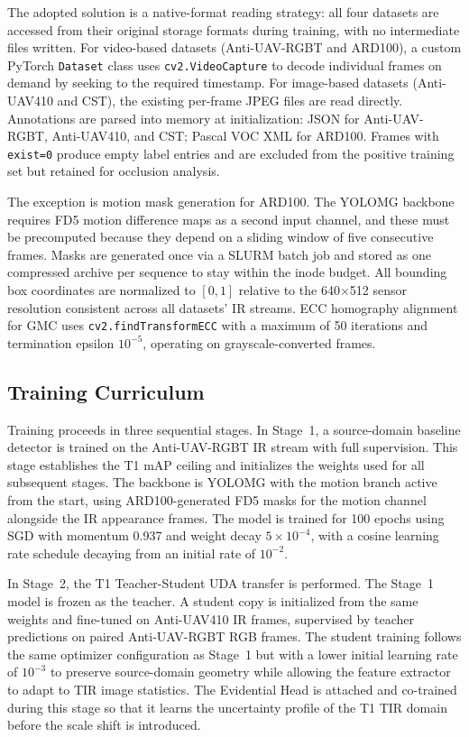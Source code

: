 The adopted solution is a native-format reading strategy: all four datasets are accessed from their original storage formats during training, with no intermediate files written. For video-based datasets (Anti-UAV-RGBT and ARD100), a custom PyTorch \texttt{Dataset} class uses \texttt{cv2.VideoCapture} to decode individual frames on demand by seeking to the required timestamp. For image-based datasets (Anti-UAV410 and CST), the existing per-frame JPEG files are read directly. Annotations are parsed into memory at initialization: JSON for Anti-UAV-RGBT, Anti-UAV410, and CST; Pascal VOC XML for ARD100. Frames with \texttt{exist=0} produce empty label entries and are excluded from the positive training set but retained for occlusion analysis.

The exception is motion mask generation for ARD100. The YOLOMG backbone requires FD5 motion difference maps as a second input channel, and these must be precomputed because they depend on a sliding window of five consecutive frames. Masks are generated once via a SLURM batch job and stored as one compressed archive per sequence to stay within the inode budget. All bounding box coordinates are normalized to $[0,1]$ relative to the 640$\times$512 sensor resolution consistent across all datasets' IR streams. ECC homography alignment for GMC uses \texttt{cv2.findTransformECC} with a maximum of 50 iterations and termination epsilon $10^{-5}$, operating on grayscale-converted frames.

\subsection{Training Curriculum}
\label{sec:training}

Training proceeds in three sequential stages. In Stage~1, a source-domain baseline detector is trained on the Anti-UAV-RGBT IR stream with full supervision. This stage establishes the T1 mAP ceiling and initializes the weights used for all subsequent stages. The backbone is YOLOMG with the motion branch active from the start, using ARD100-generated FD5 masks for the motion channel alongside the IR appearance frames. The model is trained for 100 epochs using SGD with momentum 0.937 and weight decay $5 \times 10^{-4}$, with a cosine learning rate schedule decaying from an initial rate of $10^{-2}$.

In Stage~2, the T1 Teacher-Student UDA transfer is performed. The Stage~1 model is frozen as the teacher. A student copy is initialized from the same weights and fine-tuned on Anti-UAV410 IR frames, supervised by teacher predictions on paired Anti-UAV-RGBT RGB frames. The student training follows the same optimizer configuration as Stage~1 but with a lower initial learning rate of $10^{-3}$ to preserve source-domain geometry while allowing the feature extractor to adapt to TIR image statistics. The Evidential Head is attached and co-trained during this stage so that it learns the uncertainty profile of the T1 TIR domain before the scale shift is introduced.

